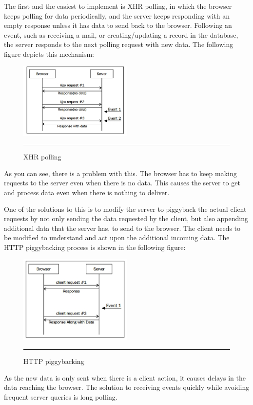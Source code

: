 The first and the easiest to implement is XHR polling, in which the browser keeps
polling for data periodically, and the server keeps responding with an empty
response unless it has data to send back to the browser. Following an event, such
as receiving a mail, or creating/updating a record in the database, the server
responds to the next polling request with new data. The following figure depicts
this mechanism:
\begin{figure}[h!]
  \centering
    \includegraphics[width=0.5\textwidth]{./Pictures/xhr.jpg}
  \rule{0.5\textwidth}{1pt}
  \caption{XHR polling}
\end{figure}
As you can see, there is a problem with this. The browser has to keep making
requests to the server even when there is no data. This causes the server to get and
process data even when there is nothing to deliver.

One of the solutions to this is to modify the server to piggyback the actual client
requests by not only sending the data requested by the client, but also appending
additional data that the server has, to send to the browser. The client needs to be
modified to understand and act upon the additional incoming data. The HTTP
piggybacking process is shown in the following figure:
\begin{figure}[h!]
  \centering
    \includegraphics[width=0.5\textwidth]{./Pictures/http_2.jpg}
  \rule{0.5\textwidth}{1pt}
  \caption{HTTP piggybacking}
\end{figure}

As the new data is only sent when there is a client action, it causes delays in the
data reaching the browser. The solution to receiving events quickly while avoiding
frequent server queries is long polling.

